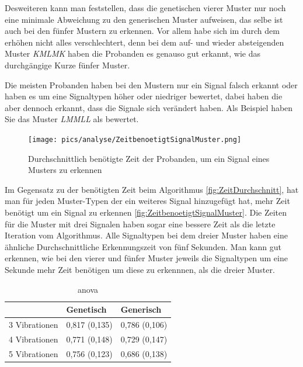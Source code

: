 Desweiteren kann man feststellen, dass die genetischen vierer Muster nur noch eine minimale Abweichung zu den generischen Muster aufweisen, das selbe ist auch bei den f{\"u}nfer Mustern zu erkennen.
Vor allem habe sich im durch dem erh{\"o}hen nicht alles verschlechtert, denn bei dem auf- und wieder absteigenden Muster \textit{KMLMK} haben die Probanden es genauso gut erkannt, wie das durchg{\"a}ngige Kurze f{\"u}nfer Muster. 

Die meisten Probanden haben bei den Mustern nur ein Signal falsch erkannt oder haben es um eine Signaltypen h{\"o}her oder niedriger bewertet, dabei  haben die aber dennoch erkannt, dass die Signale sich ver{\"a}ndert haben. Als Beispiel haben Sie das Muster \textit{LMMLL} als  bewertet. \\

\begin{figure}[htbp] 
            \centering
   	\texttt{[image: pics/analyse/ZeitbenoetigtSignalMuster.png]}
	\caption{Durchschnittlich ben{\"o}tigte Zeit der Probanden, um ein Signal eines Musters zu erkennen}
	\label{fig:ZeitbenoetigtSignalMuster}
\end{figure}
Im Gegensatz zu der ben{\"o}tigten Zeit beim Algorithmus \autoref{fig:ZeitDurchschnitt}, hat man f{\"u}r jeden Muster-Typen der ein weiteres Signal hinzugef{\"u}gt hat, mehr Zeit ben{\"o}tigt um ein Signal zu erkennen \autoref{fig:ZeitbenoetigtSignalMuster}. 
Die Zeiten f{\"u}r die Muster mit drei Signalen haben sogar eine bessere Zeit als die letzte Iteration vom Algorithmus. 
Alle Signaltypen bei dem dreier Muster haben eine {\"a}hnliche Durchschnittliche Erkennungszeit von f{\"u}nf Sekunden.
Man kann gut erkennen, wie bei den vierer und f{\"u}nfer Muster jeweils die Signaltypen um eine Sekunde mehr Zeit ben{\"o}tigen um diese zu erkennnen, als die dreier Muster.

\begin{table}[]
\centering
\caption{anova}
\label{Erkennungsrate (und Standardabweichung) der Mustertypen. Dabei wurden die Genetischen und Generischen Signale miteinander vergliechen}
\begin{tabular}{l|ll}
              & Genetisch     & Generisch     \\ \hline
3 Vibrationen & 0,817 (0,135) & 0,786 (0,106) \\
4 Vibrationen & 0,771 (0,148) & 0,729 (0,147) \\
5 Vibrationen & 0,756 (0,123) & 0,686 (0,138)
\end{tabular}
\end{table}

